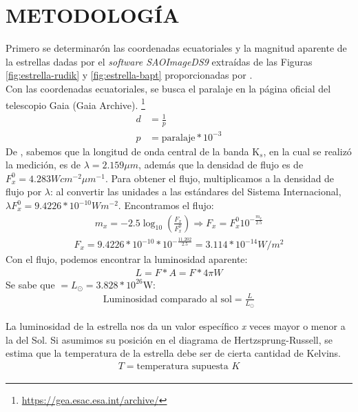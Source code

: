 \section*{METODOLOGÍA}\label{sec:analisis}


Primero se determinarón las coordenadas ecuatoriales y la magnitud aparente de la estrellas dadas por el \textit{software SAOImageDS9} extraídas de las Figuras \ref{fig:estrella-rudik} y \ref{fig:estrella-bapt} proporcionadas por \cite{lopez2019quiescent}.\\

Con las coordenadas ecuatoriales, se busca el paralaje en la página oficial del telescopio Gaia (Gaia Archive). \footnote{\url{https://gea.esac.esa.int/archive/}}\\
\begin{align}
    d&=\frac{1}{p}\\
    p&=\text{paralaje}*10^{-3}
\end{align}
De \cite{lol:cohen2003spectral}, sabemos que la longitud de onda central de la banda K$_s$, en la cual se realizó la medición, es de $\lambda=2.159\mu m$, además que la densidad de flujo es de $F_x^0=4.283Wcm^{-2}\mu m^{-1}$. Para obtener el flujo, multiplicamos a la densidad de flujo por $\lambda$: al convertir las unidades a las estándares del Sistema Internacional, $\lambda F_x^0=9.4226*10^{-10} Wm^{-2}$. Encontramos el flujo: 
\begin{align}
    m_x=-2.5\log_{10}\left(\frac{F_x}{F_x^0}\right) \Rightarrow F_x=F_x^0 10^{-\frac{m_x}{2.5}}
\end{align}
\begin{align}
    F_x= 9.4226*10^{-10}*10^{-\frac{11.202}{2.5}}=3.114*10^{-14} W/m^2
\end{align}
Con el flujo, podemos encontrar la luminosidad aparente:
\begin{align}
    L=F*A=F*4\pi W
\end{align}
Se sabe que $=L_\odot=3.828*10^{26}$W:
\begin{align}
    \text{Luminosidad comparado al sol}=\frac{L}{L_\odot}
\end{align}

La luminosidad de la estrella nos da un valor específico \textit{x} veces mayor o menor a la del Sol. Si asumimos su posición en el diagrama de Hertzsprung-Russell, se estima que la temperatura de la estrella debe ser de  cierta cantidad de Kelvins. 
\begin{align}
    T = \text{temperatura supuesta } K 
\end{align}

